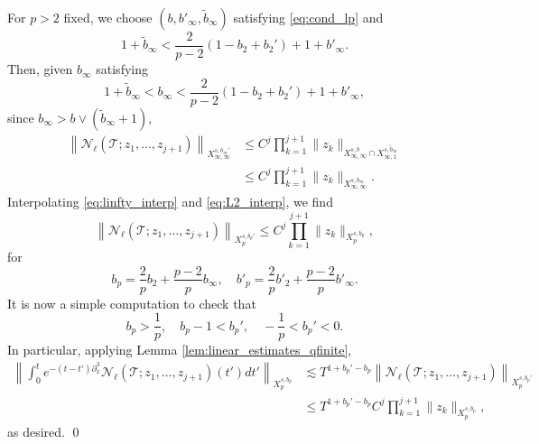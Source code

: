 \documentclass[%
11pt,  reqno]{amsart}
\newcommand{\5}{\textup{V}}
\newcommand{\dx}{\partial_x}
\theoremstyle{remark}
\newcommand{\TT}{\mathcal{T}}
\renewcommand{\l}{\ell}
\numberwithin{equation}{section}
\numberwithin{theorem}{section}
\newcommand{\Ncal}{\mathcal{N}}
\begin{document}
For $p>2$ fixed, we choose $(b, b'_\infty, \tilde{b}_\infty)$ satisfying \eqref{eq:cond_lp} and
\begin{equation}
    1+\tilde{b}_\infty <\frac{2}{p-2}(1-b_2+b_2') + 1 + b'_\infty.
\end{equation}
Then, given $b_\infty$ satisfying
\begin{equation}
    1+\tilde{b}_\infty<b_\infty <\frac{2}{p-2}(1-b_2+b_2') + 1 + b'_\infty,
\end{equation}
since $b_\infty>b\lor(\tilde{b}_\infty+1)$,
\begin{align}
    \left\| \Ncal_\l(\TT; z_1,\dots, z_{j+1})\right\|_{X^{s,b_\infty'}_{\infty, \infty}} &\le  C^j\prod_{k=1}^{j+1}\|z_k\|_{X^{s,b}_{\infty, \infty}\cap X^{s,\tilde{b}_\infty}_{\infty,1}}\\&\le  C^j\prod_{k=1}^{j+1}\|z_k\|_{X^{s,b_\infty}_{\infty, \infty}}.\label{eq:linfty_interp}
\end{align}
Interpolating \eqref{eq:linfty_interp} and \eqref{eq:L2_interp}, we find
\begin{equation}\label{eq:Lp_interp}
		\left\| \Ncal_\l(\TT; z_1,\dots, z_{j+1})\right\|_{X^{s,b_p'}_{p}}  \le  C^j\prod_{k=1}^{j+1}\|z_k\|_{X^{s,b_p}_{p}},
\end{equation}
for
$$
b_p=\frac{2}{p}b_2+\frac{p-2}{p}b_\infty,\quad b'_p=\frac{2}{p}b'_2+\frac{p-2}{p}b'_\infty.
$$
It is now a simple computation to check that
$$
b_p>\frac1p,\quad b_p-1<b_p',\quad -\frac{1}{p}<b_p'<0.
$$
In particular, applying Lemma \ref{lem:linear_estimates_qfinite},
	\begin{align}
		\left\|\int_0^t e^{-(t-t')\dx^3} \Ncal_\l(\TT; z_1,\dots, z_{j+1})(t') dt'  \right\|_{X^{s,b_p}_{p}} 
        &	\lesssim T^{1+b_p'-b_p}\left\|\Ncal_\l(\TT; z_1,\dots, z_{j+1})  \right\|_{X^{s,b_p'}_{p}} 
        \\&\le T^{1+b_p'-b_p} C^j\prod_{k=1}^{j+1}\|z_k\|_{X^{s,b_p}_{p}},
	\end{align}
as desired. \qed
\end{document}
